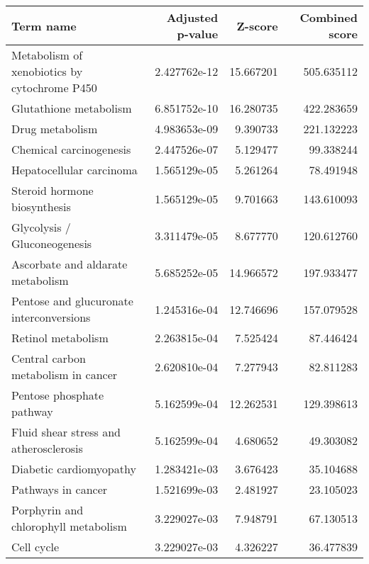 \begin{tabular}{lrrr}
\toprule
                                         Term name &  Adjusted p-value &   Z-score &  Combined score \\
\midrule
      Metabolism of xenobiotics by cytochrome P450 &      2.427762e-12 & 15.667201 &      505.635112 \\
                            Glutathione metabolism &      6.851752e-10 & 16.280735 &      422.283659 \\
                                   Drug metabolism &      4.983653e-09 &  9.390733 &      221.132223 \\
                           Chemical carcinogenesis &      2.447526e-07 &  5.129477 &       99.338244 \\
                          Hepatocellular carcinoma &      1.565129e-05 &  5.261264 &       78.491948 \\
                      Steroid hormone biosynthesis &      1.565129e-05 &  9.701663 &      143.610093 \\
                      Glycolysis / Gluconeogenesis &      3.311479e-05 &  8.677770 &      120.612760 \\
                 Ascorbate and aldarate metabolism &      5.685252e-05 & 14.966572 &      197.933477 \\
          Pentose and glucuronate interconversions &      1.245316e-04 & 12.746696 &      157.079528 \\
                                Retinol metabolism &      2.263815e-04 &  7.525424 &       87.446424 \\
               Central carbon metabolism in cancer &      2.620810e-04 &  7.277943 &       82.811283 \\
                         Pentose phosphate pathway &      5.162599e-04 & 12.262531 &      129.398613 \\
            Fluid shear stress and atherosclerosis &      5.162599e-04 &  4.680652 &       49.303082 \\
                           Diabetic cardiomyopathy &      1.283421e-03 &  3.676423 &       35.104688 \\
                                Pathways in cancer &      1.521699e-03 &  2.481927 &       23.105023 \\
              Porphyrin and chlorophyll metabolism &      3.229027e-03 &  7.948791 &       67.130513 \\
                                        Cell cycle &      3.229027e-03 &  4.326227 &       36.477839 \\

\end{tabular}
